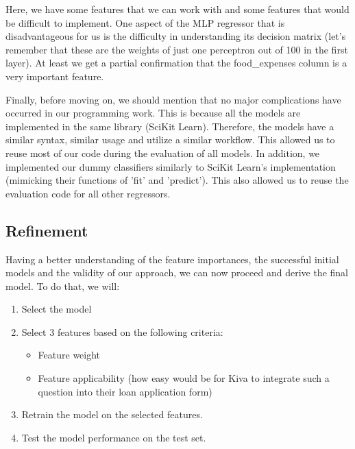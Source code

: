 \documentclass{article}
\begin{document}
Here, we have some features that we can work with and some features that would be difficult to implement. One aspect of the MLP regressor that is disadvantageous for us is the difficulty in understanding its decision matrix (let's remember that these are the weights of just one perceptron out of 100 in the first layer). At least we get a partial confirmation that the food\_expenses column is a very important feature.

Finally, before moving on, we should mention that no major complications have occurred in our programming work. This is because all the models are implemented in the same library (SciKit Learn). Therefore, the models have a similar syntax, similar usage and utilize a similar workflow. This allowed us to reuse most of our code during the evaluation of all models. In addition, we implemented our dummy classifiers similarly to SciKit Learn's implementation (mimicking their functions of 'fit' and 'predict'). This also allowed us to reuse the evaluation code for all other regressors.

\hypertarget{refinement}{\subsection{Refinement}}
Having a better understanding of the feature importances, the successful initial models and the validity of our approach, we can now proceed and derive the final model. To do that, we will:

\begin{enumerate}
  \item Select the model
  \item Select 3 features based on the following criteria:
  \begin{itemize}
    \item Feature weight
    \item Feature applicability (how easy would be for Kiva to integrate such a question into their loan application form)
  \end{itemize}
  \item Retrain the model on the selected features.
  \item Test the model performance on the test set.
\end{enumerate}
\end{document}
